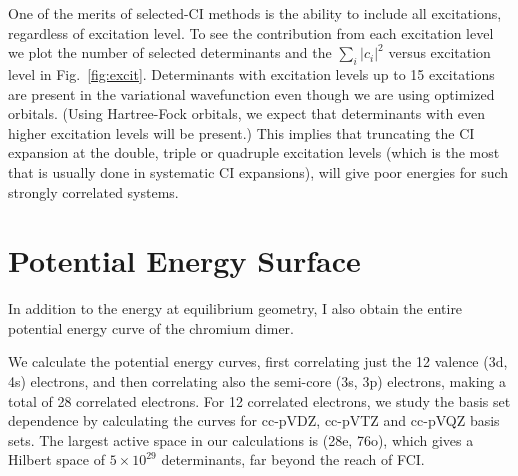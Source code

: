 One of the merits of selected-CI methods is the ability to include all excitations, regardless of excitation level.
To see the contribution from each excitation level we plot the number of selected determinants and the $\sum_i \left|c_i\right|^2$ versus excitation level in Fig.~\ref{fig:excit}.
Determinants with excitation levels up to 15 excitations are present in the variational wavefunction even though we are using optimized orbitals.
(Using Hartree-Fock orbitals, we expect that determinants with even higher excitation levels will be present.)
This implies that truncating the CI expansion at the double, triple or quadruple excitation levels (which is the most that is usually done in systematic
CI expansions), will give poor energies for such strongly correlated systems.

\section{Potential Energy Surface}
In addition to the energy at equilibrium geometry, I also obtain the entire potential energy curve of the chromium dimer.

We calculate the potential energy curves, first correlating just the 12 valence (3d, 4s) electrons, and then correlating
also the semi-core (3s,
3p) electrons, making a total of 28 correlated electrons.
For 12 correlated electrons, we study the basis set dependence by calculating the curves for cc-pVDZ, cc-pVTZ and cc-pVQZ basis sets.
The largest active space in our calculations is (28e, 76o), which gives a Hilbert space of $5\times10^{29}$ determinants, far beyond the reach of FCI.

